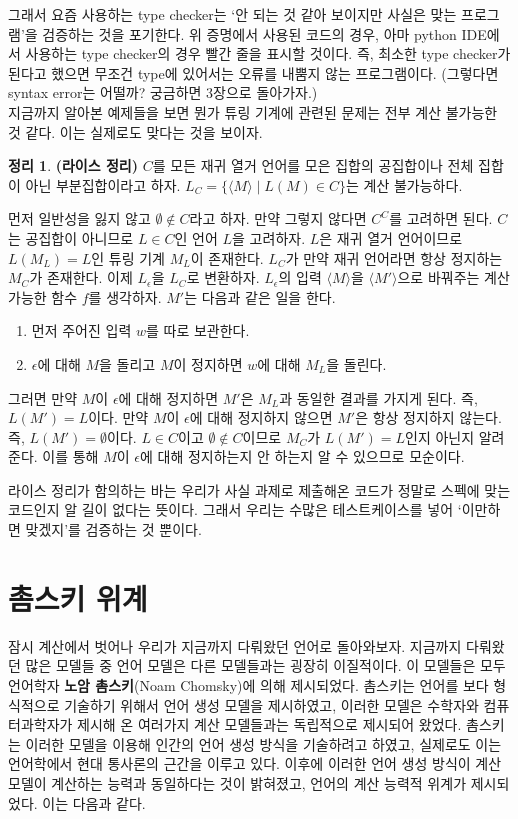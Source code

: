 \documentclass[b5paper]{book}
\theoremstyle{definition}
\newtheorem{thm}{정리}[chapter]
\newenvironment{pf*}{\pushQED{\qed}\pf}{\popQED\endpf}
\begin{document}
그래서 요즘 사용하는 type checker는 `안 되는 것 같아 보이지만 
사실은 맞는 프로그램'을 검증하는 것을 포기한다. 위 증명에서 
사용된 코드의 경우, 아마 python IDE에서 사용하는 type checker의 경우 빨간 줄을 표시할 것이다. 
즉, 최소한 type checker가 된다고 했으면 무조건 type에 있어서는 오류를 내뿜지 않는 프로그램이다. 
(그렇다면 syntax error는 어떨까? 궁금하면 3장으로 돌아가자.) \\ 
지금까지 알아본 예제들을 보면 뭔가 튜링 기계에 관련된 문제는 전부 계산 불가능한 것 같다.
이는 실제로도 맞다는 것을 보이자.
\begin{thm}
    \textbf{(라이스 정리)} $C$를 모든 재귀 열거 언어를 모은 집합의 공집합이나 
    전체 집합이 아닌 부분집합이라고 하자. $L_C = \{ \langle M \rangle \; \vert 
    \; L(M) \in C\}$는 계산 불가능하다. 
\end{thm}
\begin{pf*}
    먼저 일반성을 잃지 않고 $\emptyset \notin C$라고 하자. 만약 그렇지 않다면 $C^C$를 
    고려하면 된다.
    $C$는 공집합이 아니므로 $L\in C$인 언어 $L$을 고려하자. $L$은 재귀 열거 언어이므로
    $L(M_L) = L$인 튜링 기계 $M_L$이 존재한다. $L_C$가 만약 재귀 언어라면 항상 정지하는
    $M_C$가 존재한다. 이제 $L_\epsilon$을 $L_C$로 변환하자. $L_\epsilon$의 입력 
    $\langle M \rangle$을 $\langle M' \rangle$으로 바꿔주는 계산 가능한 함수 $f$를 생각하자.
    $M'$는 다음과 같은 일을 한다.
    \begin{enumerate}
        \item 먼저 주어진 입력 $w$를 따로 보관한다.
        \item $\epsilon$에 대해 $M$을 돌리고 $M$이 정지하면 $w$에 대해 $M_L$을 돌린다.
    \end{enumerate}
    그러면 만약 $M$이 $\epsilon$에 대해 정지하면 $M'$은 $M_L$과 동일한 결과를 가지게 된다.
    즉, $L(M') = L$이다. 만약 $M$이 $\epsilon$에 대해 정지하지 않으면 $M'$은 항상 정지하지 않는다.
    즉, $L(M') = \emptyset$이다. $L \in C$이고 $\emptyset \notin C$이므로 $M_C$가 $L(M') = L$인지
    아닌지 알려준다. 이를 통해 $M$이 $\epsilon$에 대해 정지하는지 안 하는지 알 수 있으므로 모순이다.
\end{pf*}
라이스 정리가 함의하는 바는 우리가 사실 과제로 제출해온 코드가 정말로 스펙에 맞는 코드인지
알 길이 없다는 뜻이다. 그래서 우리는 수많은 테스트케이스를 넣어 `이만하면 맞겠지'를 검증하는 것 뿐이다.
\section{촘스키 위계}
잠시 계산에서 벗어나 우리가 지금까지 다뤄왔던 언어로 돌아와보자. 지금까지 다뤄왔던 많은 모델들 중
언어 모델은 다른 모델들과는 굉장히 이질적이다. 이 모델들은 모두 
언어학자 \textbf{노암 촘스키}(Noam Chomsky)에 의해 제시되었다. 촘스키는 언어를 보다 형식적으로
기술하기 위해서 언어 생성 모델을 제시하였고, 이러한 모델은 수학자와 컴퓨터과학자가 제시해 온 여러가지
계산 모델들과는 독립적으로 제시되어 왔었다. 촘스키는 이러한 모델을 이용해 인간의 언어 생성 방식을
기술하려고 하였고, 실제로도 이는 언어학에서 현대 통사론의 근간을 이루고 있다. 이후에 이러한 언어 
생성 방식이 계산 모델이 계산하는 능력과 동일하다는 것이 밝혀졌고, 언어의 계산 능력적 위계가 제시되었다.
이는 다음과 같다.
\end{document}
